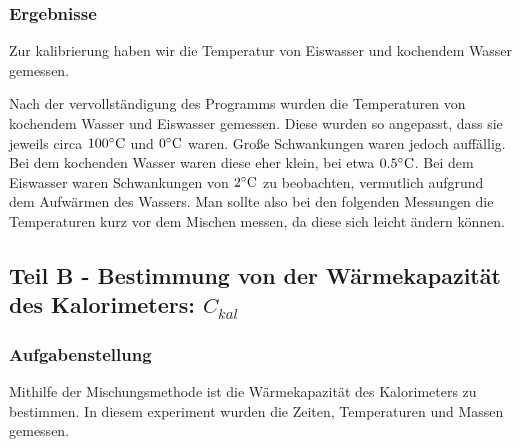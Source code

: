 \documentclass[11pt,a4paper]{article}
\begin{document}
\subsubsection{Ergebnisse}

Zur kalibrierung haben wir die Temperatur von Eiswasser und kochendem Wasser gemessen.

Nach der vervollst\"andigung des Programms wurden die Temperaturen von kochendem Wasser und Eiswasser gemessen. Diese wurden so angepasst, dass sie jeweils circa $100\celsius$ und $0\celsius$ waren. Gro\ss e Schwankungen waren jedoch auff\"allig. Bei dem kochenden Wasser waren diese eher klein, bei etwa $0.5\celsius$. Bei dem Eiswasser waren Schwankungen von $2\celsius$ zu beobachten, vermutlich aufgrund dem Aufw\"armen des Wassers. Man sollte also bei den folgenden Messungen die Temperaturen kurz vor dem Mischen messen, da diese sich leicht \"andern k\"onnen.

\subsection{Teil B - Bestimmung von der Wärmekapazität des Kalorimeters: $C_{kal}$}

\subsubsection{Aufgabenstellung}

Mithilfe der Mischungsmethode ist die W\"armekapazit\"at des Kalorimeters zu bestimmen. In diesem experiment wurden die Zeiten, Temperaturen und Massen gemessen.


\end{document}
